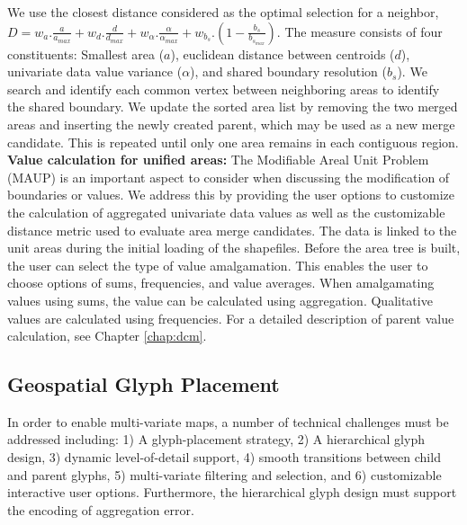 We use the closest distance considered as the optimal selection for a neighbor,
$D = w_a.\frac{a}{a_{max}} + w_d.\frac{d}{d_{max}} + w_\alpha.\frac{\alpha}{\alpha_{max}} + w_{b_s}.(1-\frac{b_s}{b_{s_{max}}})$.
The measure consists of four constituents: Smallest area ($a$), euclidean distance between centroids ($d$), univariate data value variance ($\alpha$), and shared boundary resolution ($b_s$). We search and identify each common vertex between neighboring areas to identify the shared boundary. We update the sorted area list by removing the two merged areas and inserting the newly created parent, which may be used as a new merge candidate. This is repeated until only one area remains in each contiguous region.\\
\textbf{Value calculation for unified areas:} The Modifiable Areal Unit Problem (MAUP) \cite{openshaw1984modifiable} is an important aspect to consider when discussing the modification of boundaries or values. We address this by providing the user options to customize the calculation of aggregated univariate data values as well as the customizable distance metric used to evaluate area merge candidates. The data is linked to the unit areas during the initial loading of the shapefiles. Before the area tree is built, the user can select the type of value amalgamation. This enables the user to choose options of sums,  frequencies, and value averages. When amalgamating values using sums, the value can be calculated using aggregation. Qualitative values are calculated using frequencies. For a detailed description of parent value calculation, see Chapter \ref{chap:dcm}.
\subsection{Geospatial Glyph Placement} \label{sec:rendering}
In order to enable multi-variate maps, a number of technical challenges must be addressed including: 1) A glyph-placement strategy, 2) A hierarchical glyph design, 3) dynamic level-of-detail support, 4) smooth transitions between child and parent glyphs, 5) multi-variate filtering and selection, and 6) customizable interactive user options. Furthermore, the hierarchical glyph design must support the encoding of aggregation error.

